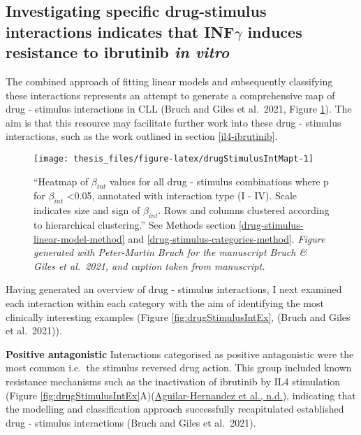 \documentclass[11pt, a4paper, twosided]{book}
\begin{document}
\hypertarget{drug-stimulus-interaction-examples}{%
\subsection{\texorpdfstring{Investigating specific drug-stimulus interactions indicates that INF\(\gamma\) induces resistance to ibrutinib \emph{in vitro}}{Investigating specific drug-stimulus interactions indicates that INF\textbackslash gamma induces resistance to ibrutinib in vitro}}\label{drug-stimulus-interaction-examples}}

The combined approach of fitting linear models and subsequently classifying these interactions represents an attempt to generate a comprehensive map of drug - stimulus interactions in CLL (Bruch and Giles et al.~2021, Figure \ref{fig:drugStimulusIntMapt}). The aim is that this resource may facilitate further work into these drug - stimulus interactions, such as the work outlined in section \ref{il4-ibrutinib}.


\begin{figure}

{\centering \texttt{[image: thesis\_files/figure-latex/drugStimulusIntMapt-1]} 

}

\caption{``Heatmap of \(\beta_{int}\) values for all drug - stimulus combinations where p for \(\beta_{int}\) \textless0.05, annotated with interaction type (I - IV). Scale indicates size and sign of \(\beta_{int}\). Rows and columns clustered according to hierarchical clustering.'' See Methods section \ref{drug-stimulus-linear-model-method} and \ref{drug-stimulus-categories-method}. \emph{Figure generated with Peter-Martin Bruch for the manuscript Bruch \& Giles et al.~2021, and caption taken from manuscript.}}\label{fig:drugStimulusIntMapt}
\end{figure}
Having generated an overview of drug - stimulus interactions, I next examined each interaction within each category with the aim of identifying the most clinically interesting examples (Figure \ref{fig:drugStimulusIntEx}, (Bruch and Giles et al.~2021)).

\textbf{Positive antagonistic} Interactions categorised as positive antagonistic were the most common i.e.~the stimulus reversed drug action. This group included known resistance mechanisms such as the inactivation of ibrutinib by IL4 stimulation (Figure \ref{fig:drugStimulusIntEx}A)(\protect\hyperlink{ref-AguilarHernandez2016}{Aguilar-Hernandez et al., n.d.}), indicating that the modelling and classification approach successfully recapitulated established drug - stimulus interactions (Bruch and Giles et al.~2021).
\end{document}
